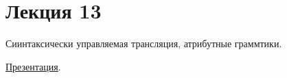 \section{Лекция 13}

Сиинтаксически управляемая трансляция, атрибутные граммтики.

\href{https://github.com/YaccConstructor/articles/blob/master/InProgress/Formal_languages_course/attrib_grammars/presentation.pdf}{Презентация}.
